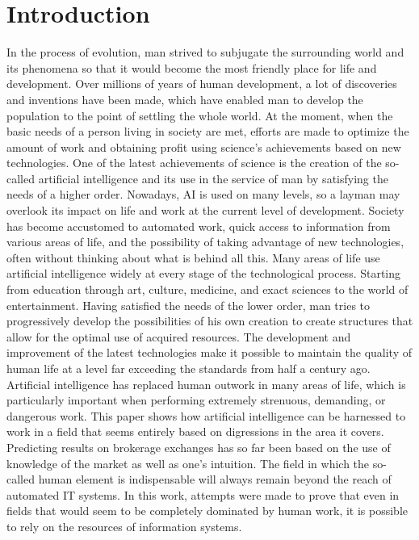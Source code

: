 \chapter{Introduction}

In the process of evolution, man strived to subjugate the surrounding world and its phenomena so that it would become the most friendly place for life and development. Over
millions of years of human development, a lot of discoveries and inventions have been made, which
have enabled man to develop the population to the point of settling the whole world. At the
moment, when the basic needs of a person living in society are met, efforts are made to optimize the
amount of work and obtaining profit using science's achievements based on new technologies.
One of the latest achievements of science is the creation of the so-called artificial intelligence and its
use in the service of man by satisfying the needs of a higher order.
Nowadays, AI is used on many levels, so a layman may overlook its impact on life and work
at the current level of development.
Society has become accustomed to automated work, quick access to information from various
areas of life, and the possibility of taking advantage of new technologies, often without thinking
about what is behind all this. Many areas of life use artificial intelligence widely at every stage of the
technological process.
Starting from education through art, culture, medicine, and exact sciences to the world of entertainment.
Having satisfied the needs of the lower order, man tries to progressively develop the possibilities of
his own creation to create structures that allow for the optimal use of acquired resources. The
development and improvement of the latest technologies make it possible to maintain the quality of
human life at a level far exceeding the standards from half a century ago.
Artificial intelligence has replaced human outwork in many areas of life, which is particularly important when performing extremely strenuous, demanding, or dangerous work. This
paper shows how artificial intelligence can be harnessed to work in a field that seems
entirely based on digressions in the area it covers. Predicting results on brokerage exchanges has so
far been based on the use of knowledge of the market as well as one's intuition. The field in which the so-called human element is indispensable will always remain beyond the
reach of automated IT systems.
In this work, attempts were made to prove that even in fields that would seem to be completely
dominated by human work, it is possible to rely on the resources of information systems.

